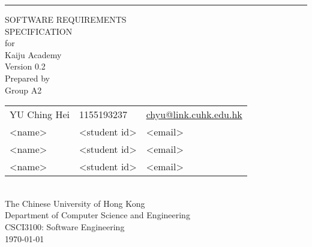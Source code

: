 \documentclass[a4paper, 11pt]{scrreprt}
\date{}
\def\myversion{0.2}
\def\projectname{Kaiju Academy}  %
\begin{document}

\begin{titlepage}
    \begin{flushright}
        \rule{\textwidth}{5pt}\vskip1cm
        \begin{bfseries}
            \Huge{SOFTWARE REQUIREMENTS\\ SPECIFICATION}\\
            \vspace{1.6cm}
            for\\
            \vspace{1.6cm}
            \projectname\\  %
            \vspace{1.6cm}
            \LARGE{Version \myversion}\\
            \vspace{1.6cm}
            Prepared by\\
            Group A2\\
            \begin{tabularx}{\textwidth}{X l X}
            YU Ching Hei & 1155193237 & \href{mailto:chyu@link.cuhk.edu.hk}{chyu@link.cuhk.edu.hk}\\
            <name> & <student id> & <email>\\
            <name> & <student id> & <email>\\
            <name> & <student id> & <email>\\
            \end{tabularx}\\
            \vspace{1.6cm}
            The Chinese University of Hong Kong\\
            Department of Computer Science and Engineering\\
            CSCI3100: Software Engineering\\
            \vspace{1.6cm}
            \today\\
        \end{bfseries}
    \end{flushright}
\end{titlepage}

\tableofcontents

\end{document}
